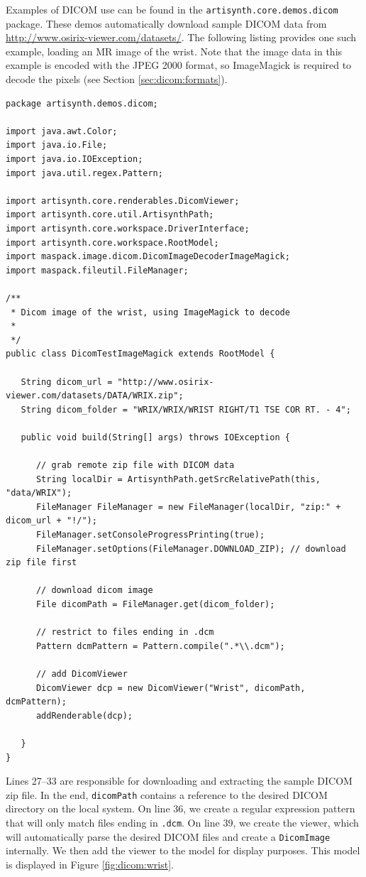 Examples of DICOM use can be found in the \texttt{artisynth.core.demos.dicom} package.
These demos automatically download sample DICOM data from \url{http://www.osirix-viewer.com/datasets/}.
The following listing provides one such example, loading an MR image of the wrist.  Note that
the image data in this example is encoded with the JPEG 2000 format, so ImageMagick is required
to decode the pixels (see Section \ref{sec:dicom:formats}).
\lstset{numbers=left}
\begin{lstlisting}[]
package artisynth.demos.dicom;

import java.awt.Color;
import java.io.File;
import java.io.IOException;
import java.util.regex.Pattern;

import artisynth.core.renderables.DicomViewer;
import artisynth.core.util.ArtisynthPath;
import artisynth.core.workspace.DriverInterface;
import artisynth.core.workspace.RootModel;
import maspack.image.dicom.DicomImageDecoderImageMagick;
import maspack.fileutil.FileManager;

/**
 * Dicom image of the wrist, using ImageMagick to decode
 *
 */
public class DicomTestImageMagick extends RootModel {

   String dicom_url = "http://www.osirix-viewer.com/datasets/DATA/WRIX.zip";
   String dicom_folder = "WRIX/WRIX/WRIST RIGHT/T1 TSE COR RT. - 4";
   
   public void build(String[] args) throws IOException {
      
      // grab remote zip file with DICOM data
      String localDir = ArtisynthPath.getSrcRelativePath(this, "data/WRIX");
      FileManager FileManager = new FileManager(localDir, "zip:" + dicom_url + "!/");
      FileManager.setConsoleProgressPrinting(true);
      FileManager.setOptions(FileManager.DOWNLOAD_ZIP); // download zip file first

      // download dicom image
      File dicomPath = FileManager.get(dicom_folder);
      
      // restrict to files ending in .dcm
      Pattern dcmPattern = Pattern.compile(".*\\.dcm");
      
      // add DicomViewer
      DicomViewer dcp = new DicomViewer("Wrist", dicomPath, dcmPattern);
      addRenderable(dcp);
      
   }
} 
\end{lstlisting}
\lstset{numbers=none}
Lines 27--33 are responsible for downloading and extracting the sample DICOM
zip file.  In the end, \lstinline{dicomPath} contains a reference to the 
desired DICOM directory on the local system.  On line 36, we create
a regular expression pattern that will only match files ending in \texttt{.dcm}.
On line 39, we create the viewer, which will automatically parse the 
desired DICOM files and create a \lstinline{DicomImage} internally.  
We then add the viewer to the model for display purposes.  This model is
displayed in Figure \ref{fig:dicom:wrist}.

